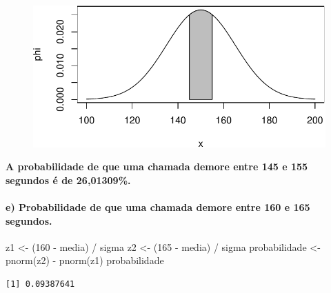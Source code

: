 \documentclass[
  letterpaper,
  DIV=11,
  numbers=noendperiod]{scrartcl}
\let\oldparagraph\paragraph
\renewcommand{\paragraph}[1]{\oldparagraph{#1}\mbox{}}
\newenvironment{Shaded}{\begin{snugshade}}{\end{snugshade}}
\newcommand{\DecValTok}[1]{\textcolor[rgb]{0.68,0.00,0.00}{#1}}
\newcommand{\FunctionTok}[1]{\textcolor[rgb]{0.28,0.35,0.67}{#1}}
\newcommand{\NormalTok}[1]{\textcolor[rgb]{0.00,0.23,0.31}{#1}}
\newcommand{\OtherTok}[1]{\textcolor[rgb]{0.00,0.23,0.31}{#1}}
\newcommand{\SpecialCharTok}[1]{\textcolor[rgb]{0.37,0.37,0.37}{#1}}
\begin{document}
\begin{figure}[H]

{\centering \includegraphics{quiz5_files/figure-pdf/unnamed-chunk-8-1.pdf}

}

\end{figure}

\textbf{A probabilidade de que uma chamada demore entre 145 e 155
segundos é de 26,01309\%.}

\hypertarget{e-probabilidade-de-que-uma-chamada-demore-entre-160-e-165-segundos.}{%
\paragraph{e) Probabilidade de que uma chamada demore entre 160 e 165
segundos.}\label{e-probabilidade-de-que-uma-chamada-demore-entre-160-e-165-segundos.}}

\begin{Shaded}
\begin{Highlighting}[]
\NormalTok{z1 }\OtherTok{\textless{}{-}}\NormalTok{ (}\DecValTok{160}  \SpecialCharTok{{-}}\NormalTok{ media) }\SpecialCharTok{/}\NormalTok{ sigma}
\NormalTok{z2 }\OtherTok{\textless{}{-}}\NormalTok{ (}\DecValTok{165}  \SpecialCharTok{{-}}\NormalTok{ media) }\SpecialCharTok{/}\NormalTok{ sigma}
\NormalTok{probabilidade }\OtherTok{\textless{}{-}} \FunctionTok{pnorm}\NormalTok{(z2) }\SpecialCharTok{{-}} \FunctionTok{pnorm}\NormalTok{(z1)}
\NormalTok{probabilidade}
\end{Highlighting}
\end{Shaded}

\begin{verbatim}
[1] 0.09387641
\end{verbatim}
\end{document}
